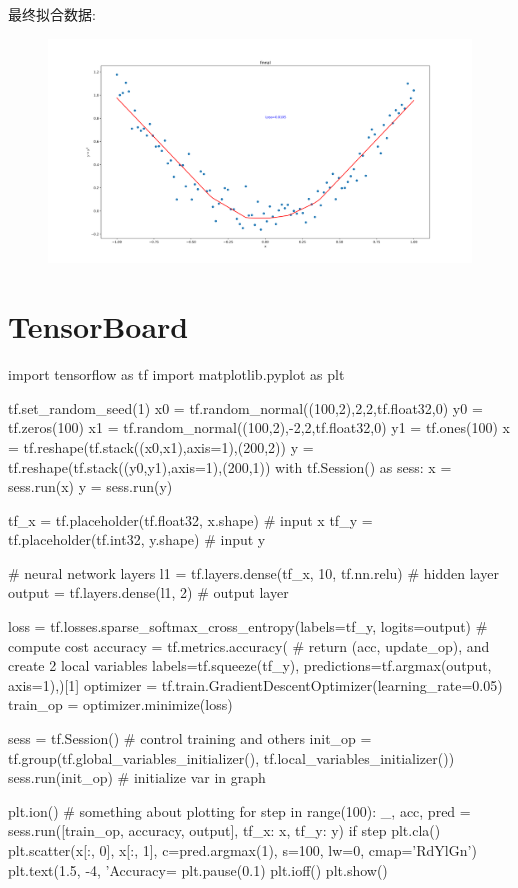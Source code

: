 最终拟合数据:
\begin{figure}[H]
\includegraphics[scale=0.4]{./pic/chapter1/final.png}
\end{figure}
\section{TensorBoard}
\begin{python}
import tensorflow as tf
import matplotlib.pyplot as plt

tf.set_random_seed(1)
x0 = tf.random_normal((100,2),2,2,tf.float32,0)
y0 = tf.zeros(100)
x1 = tf.random_normal((100,2),-2,2,tf.float32,0)
y1 = tf.ones(100)
x = tf.reshape(tf.stack((x0,x1),axis=1),(200,2))
y = tf.reshape(tf.stack((y0,y1),axis=1),(200,1))
with tf.Session() as sess:
    x = sess.run(x)
    y = sess.run(y)

tf_x = tf.placeholder(tf.float32, x.shape)     # input x
tf_y = tf.placeholder(tf.int32, y.shape)     # input y

# neural network layers
l1 = tf.layers.dense(tf_x, 10, tf.nn.relu)          # hidden layer
output = tf.layers.dense(l1, 2)                     # output layer

loss = tf.losses.sparse_softmax_cross_entropy(labels=tf_y, logits=output)           # compute cost
accuracy = tf.metrics.accuracy(          # return (acc, update_op), and create 2 local variables
            labels=tf.squeeze(tf_y), predictions=tf.argmax(output, axis=1),)[1]
optimizer = tf.train.GradientDescentOptimizer(learning_rate=0.05)
train_op = optimizer.minimize(loss)

sess = tf.Session()                                                                 # control training and others
init_op = tf.group(tf.global_variables_initializer(), tf.local_variables_initializer())
sess.run(init_op)     # initialize var in graph

plt.ion()   # something about plotting
for step in range(100):
    _, acc, pred = sess.run([train_op, accuracy, output], {tf_x: x, tf_y: y})
    if step %
        plt.cla()
        plt.scatter(x[:, 0], x[:, 1], c=pred.argmax(1), s=100, lw=0, cmap='RdYlGn')
        plt.text(1.5, -4, 'Accuracy=%
        plt.pause(0.1)
plt.ioff()
plt.show()
\end{python}
